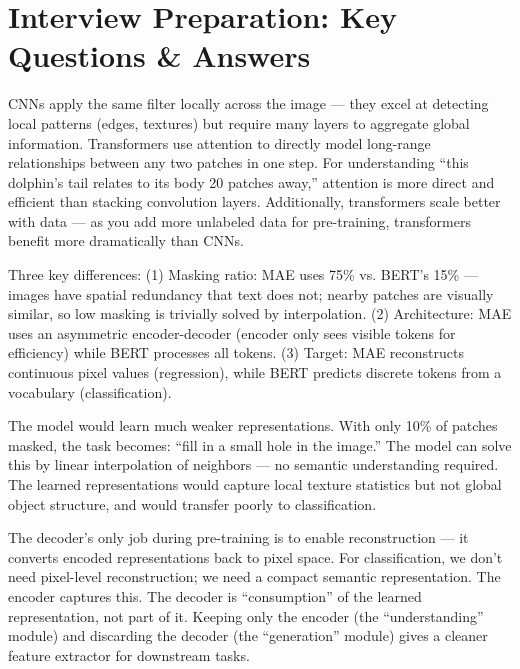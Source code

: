 \documentclass[12pt, a4paper]{report}
\begin{document}
\chapter{Interview Preparation: Key Questions \& Answers}

\begin{interviewbox}
CNNs apply the same filter locally across the image — they excel at detecting local patterns (edges, textures) but require many layers to aggregate global information. Transformers use attention to directly model long-range relationships between any two patches in one step. For understanding ``this dolphin's tail relates to its body 20 patches away,'' attention is more direct and efficient than stacking convolution layers. Additionally, transformers scale better with data — as you add more unlabeled data for pre-training, transformers benefit more dramatically than CNNs.
\end{interviewbox}

\begin{interviewbox}
Three key differences: (1) Masking ratio: MAE uses 75\% vs. BERT's 15\% — images have spatial redundancy that text does not; nearby patches are visually similar, so low masking is trivially solved by interpolation. (2) Architecture: MAE uses an asymmetric encoder-decoder (encoder only sees visible tokens for efficiency) while BERT processes all tokens. (3) Target: MAE reconstructs continuous pixel values (regression), while BERT predicts discrete tokens from a vocabulary (classification).
\end{interviewbox}

\begin{interviewbox}
The model would learn much weaker representations. With only 10\% of patches masked, the task becomes: ``fill in a small hole in the image.'' The model can solve this by linear interpolation of neighbors — no semantic understanding required. The learned representations would capture local texture statistics but not global object structure, and would transfer poorly to classification.
\end{interviewbox}

\begin{interviewbox}
The decoder's only job during pre-training is to enable reconstruction — it converts encoded representations back to pixel space. For classification, we don't need pixel-level reconstruction; we need a compact semantic representation. The encoder captures this. The decoder is ``consumption'' of the learned representation, not part of it. Keeping only the encoder (the ``understanding'' module) and discarding the decoder (the ``generation'' module) gives a cleaner feature extractor for downstream tasks.
\end{interviewbox}
\end{document}
